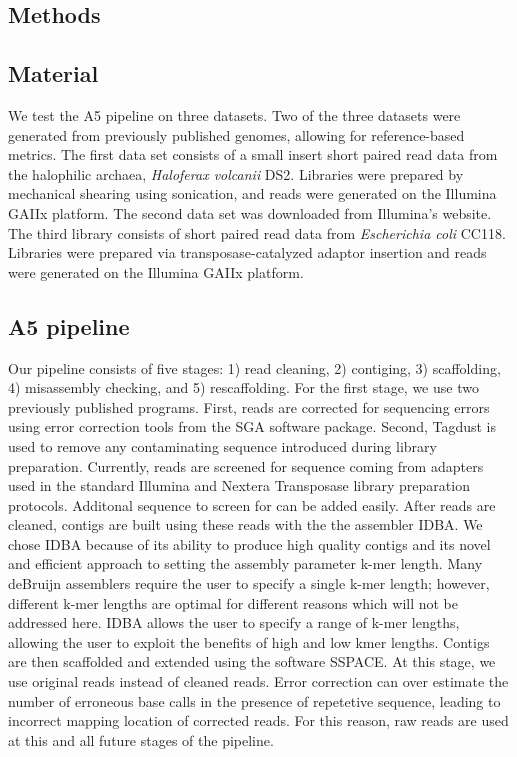 \documentclass{bioinfo}
\begin{document}
\begin{methods}
\section{Methods}
\subsection{Material}

We test the A5 pipeline on three datasets. Two of the three datasets were generated from
previously published genomes, allowing for reference-based metrics. The first data set consists of a small insert 
short paired read data from the halophilic archaea, \emph{Haloferax volcanii} DS2. Libraries
were prepared by mechanical shearing using sonication, and reads were generated on
the Illumina GAIIx platform. The second data set was downloaded from Illumina's website. 
The third library consists of short paired read data from \emph{Escherichia 
coli} CC118. Libraries were prepared via transposase-catalyzed adaptor insertion and reads 
were generated on the Illumina GAIIx platform. 

\subsection{A5 pipeline}

Our pipeline consists of five stages: 1) read cleaning, 2) contiging, 3) scaffolding,
4) misassembly checking, and 5) rescaffolding. For the first stage, we use two previously
published programs. First, reads are corrected for sequencing errors using error correction tools 
from the SGA software package. Second, Tagdust is used to remove any contaminating sequence introduced
during library preparation. Currently, reads are screened for sequence coming from adapters
used in the standard Illumina and Nextera Transposase library preparation protocols. Additonal 
sequence to screen for can be added easily. After reads are cleaned, contigs are built
using these reads with the the assembler IDBA. We chose IDBA because of its ability to produce 
high quality contigs and its novel and efficient approach to setting the assembly parameter k-mer length. 
Many deBruijn assemblers require the user to specify a single k-mer length; however, different k-mer
lengths are optimal for different reasons which will not be addressed here. IDBA allows the user to specify
a range of k-mer lengths, allowing the user to exploit the benefits of high and low kmer lengths.
Contigs are then scaffolded and extended using the software SSPACE. At this stage, we use original reads
instead of cleaned reads. Error correction can over estimate the number of erroneous base calls in 
the presence of repetetive sequence, leading to incorrect mapping location of corrected reads. 
For this reason, raw reads are used at this and all future stages of the pipeline. 


\end{methods}
\end{document}
